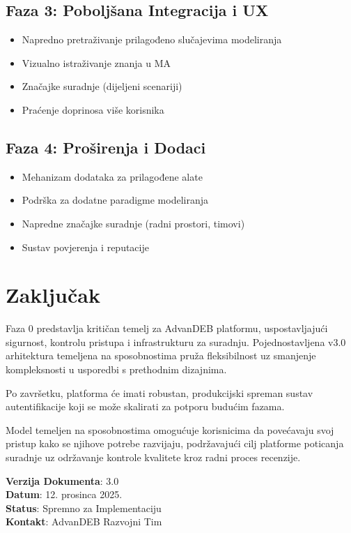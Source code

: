 \documentclass[12pt,a4paper]{article}
\begin{document}
\subsection{Faza 3: Poboljšana Integracija i UX}
\begin{itemize}
    \item Napredno pretraživanje prilagođeno slučajevima modeliranja
    \item Vizualno istraživanje znanja u MA
    \item Značajke suradnje (dijeljeni scenariji)
    \item Praćenje doprinosa više korisnika
\end{itemize}

\subsection{Faza 4: Proširenja i Dodaci}
\begin{itemize}
    \item Mehanizam dodataka za prilagođene alate
    \item Podrška za dodatne paradigme modeliranja
    \item Napredne značajke suradnje (radni prostori, timovi)
    \item Sustav povjerenja i reputacije
\end{itemize}

\section{Zaključak}

Faza 0 predstavlja kritičan temelj za AdvanDEB platformu, uspostavljajući sigurnost, kontrolu pristupa i infrastrukturu za suradnju. Pojednostavljena v3.0 arhitektura temeljena na sposobnostima pruža fleksibilnost uz smanjenje kompleksnosti u usporedbi s prethodnim dizajnima.

Po završetku, platforma će imati robustan, produkcijski spreman sustav autentifikacije koji se može skalirati za potporu budućim fazama.

Model temeljen na sposobnostima omogućuje korisnicima da povećavaju svoj pristup kako se njihove potrebe razvijaju, podržavajući cilj platforme poticanja suradnje uz održavanje kontrole kvalitete kroz radni proces recenzije.

\vspace{1cm}

\noindent\textbf{Verzija Dokumenta}: 3.0\\
\textbf{Datum}: 12. prosinca 2025.\\
\textbf{Status}: Spremno za Implementaciju\\
\textbf{Kontakt}: AdvanDEB Razvojni Tim
\end{document}

